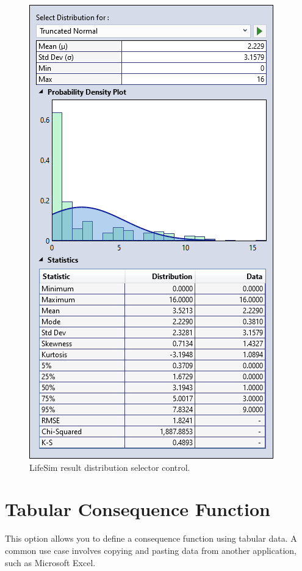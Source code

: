 \documentclass[
]{book}
\begin{document}
\begin{figure}

{\centering \includegraphics{images/figure115} 

}

\caption{LifeSim result distribution selector control.}\label{fig:figure-115}
\end{figure}

\hypertarget{tabular-consequence-function}{%
\section{Tabular Consequence Function}\label{tabular-consequence-function}}

This option allows you to define a consequence function using tabular data. A common use case involves copying and pasting data from another application, such as Microsoft Excel.
\end{document}

